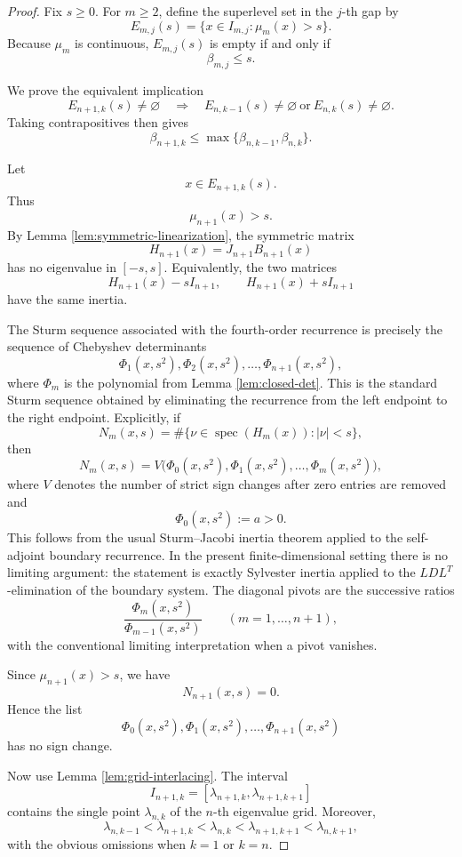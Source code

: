 \documentclass[11pt]{amsart}
\numberwithin{equation}{section}
\DeclareMathOperator{\spec}{spec}
\begin{document}
\begin{proof}
Fix \(s\ge0\).  For \(m\ge2\), define the superlevel set in the \(j\)-th
gap by
\[
        E_{m,j}(s)
        =
        \{x\in I_{m,j}:\mu_m(x)>s\}.
\]
Because \(\mu_m\) is continuous, \(E_{m,j}(s)\) is empty if and only if
\[
        \beta_{m,j}\le s.
\]

We prove the equivalent implication
\[
        E_{n+1,k}(s)\neq\varnothing
        \quad\Longrightarrow\quad
        E_{n,k-1}(s)\neq\varnothing
        \ \text{or}\
        E_{n,k}(s)\neq\varnothing .
\]
Taking contrapositives then gives
\[
        \beta_{n+1,k}\le \max\{\beta_{n,k-1},\beta_{n,k}\}.
\]

Let
\[
        x\in E_{n+1,k}(s).
\]
Thus
\[
        \mu_{n+1}(x)>s.
\]
By Lemma \ref{lem:symmetric-linearization}, the symmetric matrix
\[
        H_{n+1}(x)=J_{n+1}B_{n+1}(x)
\]
has no eigenvalue in \([-s,s]\).  Equivalently, the two matrices
\[
        H_{n+1}(x)-sI_{n+1},
        \qquad
        H_{n+1}(x)+sI_{n+1}
\]
have the same inertia.

The Sturm sequence associated with the fourth-order recurrence is precisely
the sequence of Chebyshev determinants
\[
        \Phi_1(x,s^2),\Phi_2(x,s^2),\dots,\Phi_{n+1}(x,s^2),
\]
where \(\Phi_m\) is the polynomial from Lemma \ref{lem:closed-det}.  This is
the standard Sturm sequence obtained by eliminating the recurrence from the
left endpoint to the right endpoint.  Explicitly, if
\[
        N_m(x,s)
        =
        \#\{\nu\in\spec(H_m(x)):|\nu|<s\},
\]
then
\[
        N_m(x,s)
        =
        V\bigl(\Phi_0(x,s^2),\Phi_1(x,s^2),\dots,\Phi_m(x,s^2)\bigr),
\]
where \(V\) denotes the number of strict sign changes after zero entries are
removed and
\[
        \Phi_0(x,s^2):=a>0.
\]
This follows from the usual Sturm--Jacobi inertia theorem applied to the
self-adjoint boundary recurrence.  In the present finite-dimensional setting
there is no limiting argument: the statement is exactly Sylvester inertia
applied to the \(LDL^T\)-elimination of the boundary system.  The diagonal
pivots are the successive ratios
\[
        \frac{\Phi_m(x,s^2)}{\Phi_{m-1}(x,s^2)}
        \qquad (m=1,\dots,n+1),
\]
with the conventional limiting interpretation when a pivot vanishes.

Since \(\mu_{n+1}(x)>s\), we have
\[
        N_{n+1}(x,s)=0.
\]
Hence the list
\[
        \Phi_0(x,s^2),\Phi_1(x,s^2),\dots,\Phi_{n+1}(x,s^2)
\]
has no sign change.

Now use Lemma \ref{lem:grid-interlacing}.  The interval
\[
        I_{n+1,k}=[\lambda_{n+1,k},\lambda_{n+1,k+1}]
\]
contains the single point \(\lambda_{n,k}\) of the \(n\)-th eigenvalue grid.
Moreover,
\[
        \lambda_{n,k-1}
        <
        \lambda_{n+1,k}
        <
        \lambda_{n,k}
        <
        \lambda_{n+1,k+1}
        <
        \lambda_{n,k+1},
\]
with the obvious omissions when \(k=1\) or \(k=n\).


\end{proof}
\end{document}
